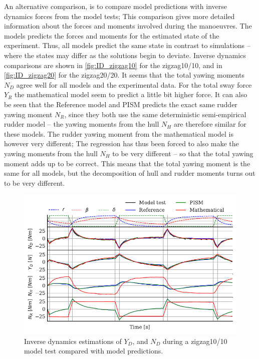 An alternative comparison, is to compare model predictions with inverse dynamics forces from the model tests; This comparison gives more detailed information about the forces and moments involved during the manoeuvres. The models predicts the forces and moments for the estimated state of the experiment. Thus, all models predict the same state in contrast to simulations -- where the states may differ as the solutions begin to deviate. Inverse dynamics comparisons are shown in \autoref{fig:ID_zigzag10} for the zigzag10/10, and in \autoref{fig:ID_zigzag20} for the zigzag20/20.    
It seems that the total yawing moments $N_D$ agree well for all models and the experimental data. For the total sway force $Y_R$ the mathematical model seem to predict a little bit higher force.  
It can also be seen that the Reference model and PISM predicts the exact same rudder yawing moment $N_R$, since they both use the same deterministic semi-empirical rudder model -- the yawing moments from the hull $N_H$ are therefore similar for these models. The rudder yawing moment from the mathematical model is however very different; The regression has thus been forced to also make the yawing moments from the hull $N_H$ to be very different -- so that the total yawing moment adds up to be correct. This means that the total yawing moment is the same for all models, but the decomposition of hull and rudder moments turns out to be very different.
\begin{figure}[h]
    \centering
    \includegraphics[width=\columnwidth]{figures/results.ID_zigzag10.pdf}
    \caption{Inverse dynamics estimations of $Y_D$, and $N_D$ during a zigzag10/10 model test compared with model predictions.}
    \label{fig:ID_zigzag10}
\end{figure}
